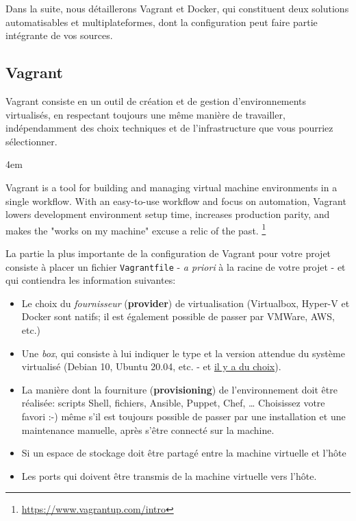 \documentclass[11pt]{amsbook}
\renewenvironment{quotation}
{   \leftskip 4em \begin{em} }
{\end{em}\par }
\begin{document}
Dans la suite, nous détaillerons Vagrant et Docker, qui constituent deux solutions automatisables et multiplateformes, dont la configuration peut faire partie intégrante de vos sources.


\hypertarget{x-vagrant}{\subsection{Vagrant}}
Vagrant consiste en un outil de création et de gestion d’environnements virtualisés, en respectant toujours une même manière de travailler, indépendamment des choix techniques et de l’infrastructure que vous pourriez sélectionner.


\begin{quotation}
Vagrant is a tool for building and managing virtual machine environments in a single workflow. With an easy-to-use workflow and focus on automation, Vagrant lowers development environment setup time, increases production parity, and makes the "works on my machine" excuse a relic of the past. \footnote{\href{https://www.vagrantup.com/intro}{https://www.vagrantup.com/intro}}
\end{quotation}

La partie la plus importante de la configuration de Vagrant pour votre projet consiste à placer un fichier \texttt{Vagrantfile} - \emph{a priori} à la racine de votre projet - et qui contiendra les information suivantes:


\begin{itemize}

\item Le choix du \emph{fournisseur} (\textbf{provider}) de virtualisation (Virtualbox, Hyper-V et Docker sont natifs; il est également possible de passer par VMWare, AWS, etc.)

\item Une \emph{box}, qui consiste à lui indiquer le type et la version attendue du système virtualisé (Debian 10, Ubuntu 20.04, etc. - et \href{https://app.vagrantup.com/boxes/search}{il y a du choix}).

\item La manière dont la fourniture (\textbf{provisioning}) de l’environnement doit être réalisée: scripts Shell, fichiers, Ansible, Puppet, Chef, …​ Choisissez votre favori :-) même s’il est toujours possible de passer par une installation et une maintenance manuelle, après s’être connecté sur la machine.

\item Si un espace de stockage doit être partagé entre la machine virtuelle et l’hôte

\item Les ports qui doivent être transmis de la machine virtuelle vers l’hôte.

\end{itemize}
\end{document}

